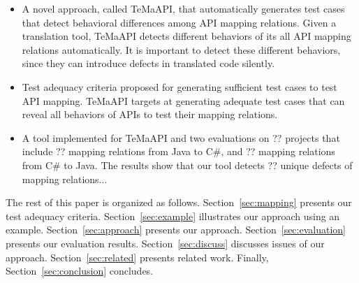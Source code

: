 \begin{itemize}\vspace*{-1.5ex}
\item A novel approach, called TeMaAPI, that automatically generates test cases that detect behavioral differences among API mapping relations. Given a translation tool, TeMaAPI detects different behaviors of its all API mapping relations automatically. It is important to detect these different behaviors, since they can introduce defects in translated code silently.\vspace*{-1.5ex}
\item Test adequacy criteria proposed for generating sufficient test cases to test API mapping. TeMaAPI targets at generating adequate test cases that can reveal all behaviors of APIs to test their mapping relations.\vspace*{-1.5ex}
\item A tool implemented for TeMaAPI and two evaluations on ?? projects that include ?? mapping relations from Java to C\#, and ?? mapping relations from C\# to Java. The results show that our tool detects ?? unique defects of mapping relations...
\end{itemize}\vspace*{-1.5ex}

The rest of this paper is organized as follows.
Section~\ref{sec:mapping} presents our test adequacy criteria.
Section~\ref{sec:example} illustrates our approach using an example.
Section~\ref{sec:approach} presents our approach.
Section~\ref{sec:evaluation} presents our evaluation results.
Section~\ref{sec:discuss} discusses issues of our approach.
Section~\ref{sec:related} presents related work.
Finally, Section~\ref{sec:conclusion} concludes.



